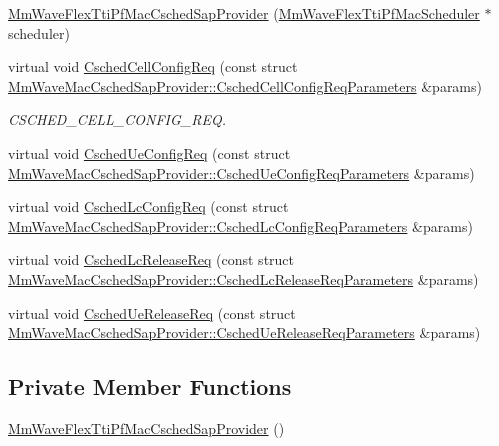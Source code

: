 \begin{DoxyCompactItemize}
\item 
\hyperlink{classns3_1_1MmWaveFlexTtiPfMacCschedSapProvider_a7505e40e4468997a48c95918a9f54b32}{Mm\+Wave\+Flex\+Tti\+Pf\+Mac\+Csched\+Sap\+Provider} (\hyperlink{classns3_1_1MmWaveFlexTtiPfMacScheduler}{Mm\+Wave\+Flex\+Tti\+Pf\+Mac\+Scheduler} $\ast$scheduler)
\item 
virtual void \hyperlink{classns3_1_1MmWaveFlexTtiPfMacCschedSapProvider_afc36df75a2b04e9df3737e528039d21e}{Csched\+Cell\+Config\+Req} (const struct \hyperlink{structns3_1_1MmWaveMacCschedSapProvider_1_1CschedCellConfigReqParameters}{Mm\+Wave\+Mac\+Csched\+Sap\+Provider\+::\+Csched\+Cell\+Config\+Req\+Parameters} \&params)
\begin{DoxyCompactList}\small\item\em C\+S\+C\+H\+E\+D\+\_\+\+C\+E\+L\+L\+\_\+\+C\+O\+N\+F\+I\+G\+\_\+\+R\+EQ. \end{DoxyCompactList}\item 
virtual void \hyperlink{classns3_1_1MmWaveFlexTtiPfMacCschedSapProvider_a870a52f15614d33dae9acec2ca78899a}{Csched\+Ue\+Config\+Req} (const struct \hyperlink{structns3_1_1MmWaveMacCschedSapProvider_1_1CschedUeConfigReqParameters}{Mm\+Wave\+Mac\+Csched\+Sap\+Provider\+::\+Csched\+Ue\+Config\+Req\+Parameters} \&params)
\item 
virtual void \hyperlink{classns3_1_1MmWaveFlexTtiPfMacCschedSapProvider_a1a57557799fa1a73b698770e37e4c567}{Csched\+Lc\+Config\+Req} (const struct \hyperlink{structns3_1_1MmWaveMacCschedSapProvider_1_1CschedLcConfigReqParameters}{Mm\+Wave\+Mac\+Csched\+Sap\+Provider\+::\+Csched\+Lc\+Config\+Req\+Parameters} \&params)
\item 
virtual void \hyperlink{classns3_1_1MmWaveFlexTtiPfMacCschedSapProvider_abf1d5e3a2478a8cda89063761d303f15}{Csched\+Lc\+Release\+Req} (const struct \hyperlink{structns3_1_1MmWaveMacCschedSapProvider_1_1CschedLcReleaseReqParameters}{Mm\+Wave\+Mac\+Csched\+Sap\+Provider\+::\+Csched\+Lc\+Release\+Req\+Parameters} \&params)
\item 
virtual void \hyperlink{classns3_1_1MmWaveFlexTtiPfMacCschedSapProvider_a68f67e6901dd5ae268e9cbd4c3a1b697}{Csched\+Ue\+Release\+Req} (const struct \hyperlink{structns3_1_1MmWaveMacCschedSapProvider_1_1CschedUeReleaseReqParameters}{Mm\+Wave\+Mac\+Csched\+Sap\+Provider\+::\+Csched\+Ue\+Release\+Req\+Parameters} \&params)
\end{DoxyCompactItemize}
\subsection*{Private Member Functions}
\begin{DoxyCompactItemize}
\item 
\hyperlink{classns3_1_1MmWaveFlexTtiPfMacCschedSapProvider_a4a8245eea4adc81d30844537e06c61e4}{Mm\+Wave\+Flex\+Tti\+Pf\+Mac\+Csched\+Sap\+Provider} ()
\end{DoxyCompactItemize}
